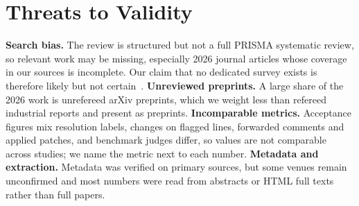 \section{Threats to Validity}\label{sec:threats}
\textbf{Search bias.} The review is structured but not a full PRISMA systematic review, so relevant work may be missing, especially 2026 journal articles whose coverage in our sources is incomplete. Our claim that no dedicated survey exists is therefore likely but not certain~\cite{tufano2025automating}. \textbf{Unreviewed preprints.} A large share of the 2026 work is unrefereed arXiv preprints, which we weight less than refereed industrial reports and present as preprints. \textbf{Incomparable metrics.} Acceptance figures mix resolution labels, changes on flagged lines, forwarded comments and applied patches, and benchmark judges differ, so values are not comparable across studies; we name the metric next to each number. \textbf{Metadata and extraction.} Metadata was verified on primary sources, but some venues remain unconfirmed and most numbers were read from abstracts or HTML full texts rather than full papers.
